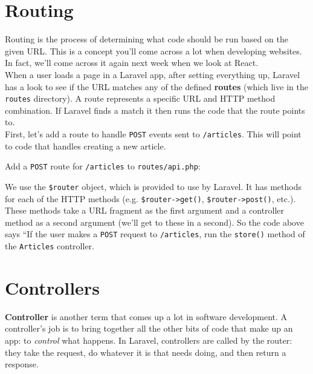 \section{Routing}

Routing is the process of determining what code should be run based on the given URL. This is a concept you'll come across a lot when developing websites. In fact, we'll come across it again next week when we look at React.
\\

When a user loads a page in a Laravel app, after setting everything up, Laravel has a look to see if the URL matches any of the defined \textbf{routes} (which live in the \texttt{routes} directory). A route represents a specific URL and HTTP method combination. If Laravel finds a match it then runs the code that the route points to.
\\

First, let's add a route to handle \texttt{POST} events sent to \texttt{/articles}. This will point to code that handles creating a new article.

\pagebreak

Add a \texttt{POST} route for \texttt{/articles} to \texttt{routes/api.php}:


We use the \texttt{\$router} object, which is provided to use by Laravel. It has methods for each of the HTTP methods (e.g. \texttt{\$router->get()}, \texttt{\$router->post()}, etc.). These methods take a URL fragment as the first argument and a controller  method as a second argument (we'll get to these in a second). So the code above says ``If the user makes a \texttt{POST} request to \texttt{/articles}, run the \texttt{store()} method of the \texttt{Articles} controller.



\section{Controllers}

\textbf{Controller} is another term that comes up a lot in software development. A controller's job is to bring together all the other bits of code that make up an app: to \textit{control} what happens. In Laravel, controllers are called by the router: they take the request, do whatever it is that needs doing, and then return a response.
\\

